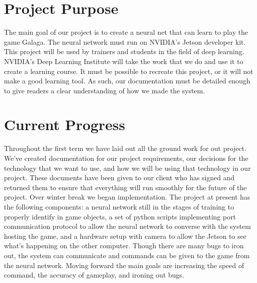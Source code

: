 \documentclass[onecolumn, draftclsnofoot,10pt, compsoc]{IEEEtran}
\begin{document}
\newpage
{}
\tableofcontents

\section{Project Purpose}
The main goal of our project is to create a neural net that can learn to play the game Galaga.
The neural network must run on NVIDIA's Jetson developer kit.
This project will be used by trainers and students in the field of deep learning.
NVIDIA's Deep Learning Institute will take the work that we do and use it to create a learning course.
It must be possible to recreate this project, or it will not make a good learning tool.
As such, our documentation must be detailed enough to give readers a clear understanding of how we made the system.

\section{Current Progress}
Throughout the first term we have laid out all the ground work for out project.
We've created documentation for our project requirements, our decisions for the technology that we want to use, and how we will be using that technology in our project.
These documents have been given to our client who has signed and returned them to ensure that everything will run smoothly for the future of the project.
\newline\newline
Over winter break we began implementation.
The project at present has the following components: a neural network still in the stages of training to properly identify in game objects, a set of python scripts implementing port communication protocol to allow the neural network to converse with the system hosting the game, and a hardware setup with camera to allow the Jetson to see what's happening on the other computer.
Though there are many bugs to iron out, the system can communicate and commands can be given to the game from the neural network.
Moving forward the main goals are increasing the speed of command, the accuracy of gameplay, and ironing out bugs.
\end{document}
